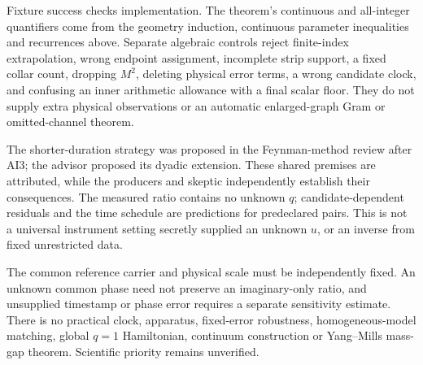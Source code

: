 Fixture success checks implementation. The theorem's continuous and all-integer quantifiers come from the geometry induction, continuous parameter inequalities and recurrences above. Separate algebraic controls reject finite-index extrapolation, wrong endpoint assignment, incomplete strip support, a fixed collar count, dropping $M^2$, deleting physical error terms, a wrong candidate clock, and confusing an inner arithmetic allowance with a final scalar floor. They do not supply extra physical observations or an automatic enlarged-graph Gram or omitted-channel theorem.

The shorter-duration strategy was proposed in the Feynman-method review after AI3; the advisor proposed its dyadic extension. These shared premises are attributed, while the producers and skeptic independently establish their consequences. The measured ratio contains no unknown $q$; candidate-dependent residuals and the time schedule are predictions for predeclared pairs. This is not a universal instrument setting secretly supplied an unknown $u$, or an inverse from fixed unrestricted data.

The common reference carrier and physical scale must be independently fixed. An unknown common phase need not preserve an imaginary-only ratio, and unsupplied timestamp or phase error requires a separate sensitivity estimate. There is no practical clock, apparatus, fixed-error robustness, homogeneous-model matching, global $q=1$ Hamiltonian, continuum construction or Yang--Mills mass-gap theorem. Scientific priority remains unverified.

